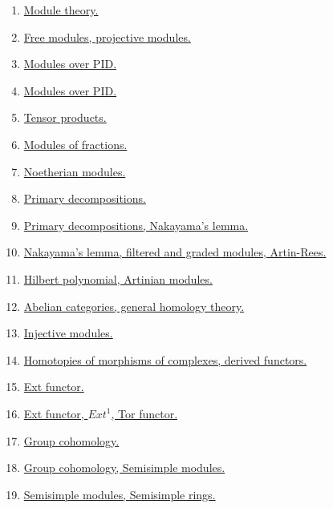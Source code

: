 \documentclass[11pt]{article}
\begin{document}
\begin{enumerate}
	\item	\href{https://mp.weixin.qq.com/s/JAThg8iM1uaNRltqVIdhzQ}{Module theory.}	%
	\item	\href{https://mp.weixin.qq.com/s/cxXgimbHhN5znpuQ_nB4GA}{Free modules, projective modules.}	%
	\item	\href{https://mp.weixin.qq.com/s/c13YK_QlRr-MB4A_OSZo_w}{Modules over PID.} 	%
	\item 	\href{https://mp.weixin.qq.com/s/LQruxav0ZyJrU-k0tFGvTA}{Modules over PID.}	%
	\item 	\href{https://mp.weixin.qq.com/s/w7NhKMEMcHUC_ob_fERxrQ}{Tensor products.}	%
	\item 	\href{https://mp.weixin.qq.com/s/oWE9gNLjl1NoONIu_hmBPQ}{Modules of fractions.}	%
	\item 	\href{https://mp.weixin.qq.com/s/9ZCy2iaVPuryIoSrKYEzBQ}{Noetherian modules.}	%
	\item 	\href{https://mp.weixin.qq.com/s/uds3g2vVGELJSAZACP0L5Q}{Primary decompositions.}	%
	\item 	\href{https://mp.weixin.qq.com/s/UHyLp3Q9iQD30SmFS55ZBg}{Primary decompositions, Nakayama's lemma.}	%
	\item 	\href{https://mp.weixin.qq.com/s/Tvq4Q1nSDMXnwLOXdp1yYA}{Nakayama's lemma, filtered and graded modules, Artin-Rees.}	%
	\item	\href{https://mp.weixin.qq.com/s/kZK2lOJ0aYR-X43SM4INtA}{Hilbert polynomial, Artinian modules.}	%
	\item	\href{https://mp.weixin.qq.com/s/dkUdC00CUT1qOBfpnFMDdg}{Abelian categories, general homology theory.}	%
	\item	\href{https://mp.weixin.qq.com/s/Ugyr8i5QO_4bYgxD_MJuZA}{Injective modules.} 	%
	\item 	\href{https://mp.weixin.qq.com/s/hXmbr96a95hyZhVIn3WyQA}{Homotopies of morphisms of complexes, derived functors.}	%
	\item 	\href{https://mp.weixin.qq.com/s/T7AaljcICmLTrtqH8n1Pvw}{Ext functor.}	%
	\item 	\href{https://mp.weixin.qq.com/s/RCbr3LO4Rzf36-Wvu30cGg}{Ext functor, $Ext^1$, Tor functor.}	%
	\item 	\href{https://mp.weixin.qq.com/s/McFpgnNkwx226dhpbtxGzg}{Group cohomology.}	%
	\item 	\href{https://mp.weixin.qq.com/s/RAuUrgfs_lc4p9jUaTvjLA}{Group cohomology, Semisimple modules.}	%
	\item 	\href{https://mp.weixin.qq.com/s/8mJEn57UM_YnlBO9nIh5EA}{Semisimple modules, Semisimple rings.}	%

\end{enumerate}
\end{document}
